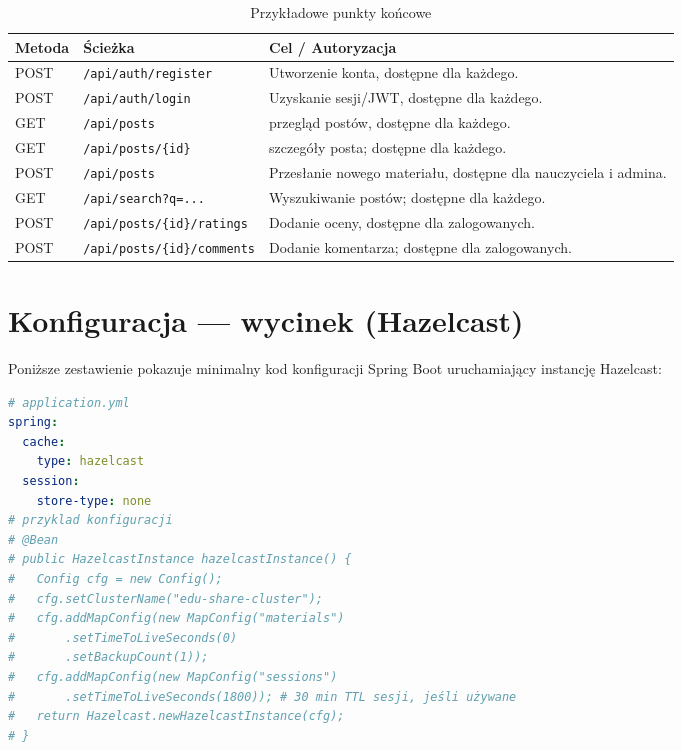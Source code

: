 \begin{table}[h]
  \centering
  \caption{Przykładowe punkty końcowe}
  \label{tab:endpoints}
  \begin{tabular}{@{}p{2.1cm}p{6.4cm}p{3.9cm}@{}}
  \toprule
  Metoda & Ścieżka & Cel / Autoryzacja \\
  \midrule
  POST & \texttt{/api/auth/register} & Utworzenie konta, dostępne dla każdego. \\
  POST & \texttt{/api/auth/login} & Uzyskanie sesji/JWT, dostępne dla każdego. \\
  GET & \texttt{/api/posts} & przegląd postów, dostępne dla każdego. \\
  GET & \texttt{/api/posts/\{id\}} & szczegóły posta; dostępne dla każdego. \\
  POST & \texttt{/api/posts} & Przesłanie nowego materiału, dostępne dla nauczyciela i admina. \\
  GET & \texttt{/api/search?q=...} & Wyszukiwanie postów; dostępne dla każdego. \\
  POST & \texttt{/api/posts/\{id\}/ratings} & Dodanie oceny, dostępne dla zalogowanych. \\
  POST & \texttt{/api/posts/\{id\}/comments} & Dodanie komentarza; dostępne dla zalogowanych. \\
  \bottomrule
  \end{tabular}
\end{table}

\section*{Konfiguracja — wycinek (Hazelcast)}
\noindent Poniższe zestawienie pokazuje minimalny kod konfiguracji Spring Boot uruchamiający instancję Hazelcast:

\begin{lstlisting}[language=yaml,caption={Minimalny fragment konfiguracji Hazelcast},label={lst:hz-config}]
# application.yml
spring:
  cache:
    type: hazelcast
  session:
    store-type: none
# przyklad konfiguracji
# @Bean
# public HazelcastInstance hazelcastInstance() {
#   Config cfg = new Config();
#   cfg.setClusterName("edu-share-cluster");
#   cfg.addMapConfig(new MapConfig("materials")
#       .setTimeToLiveSeconds(0)     
#       .setBackupCount(1));          
#   cfg.addMapConfig(new MapConfig("sessions")
#       .setTimeToLiveSeconds(1800)); # 30 min TTL sesji, jeśli używane
#   return Hazelcast.newHazelcastInstance(cfg);
# }
\end{lstlisting}

